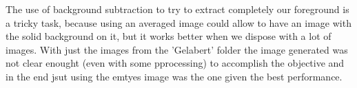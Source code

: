 \documentclass[10pt]{article}
\begin{document}
The use of background subtraction to try to extract completely our foreground is a tricky task, because using an averaged image could allow to have an image with the solid background on it, but it works better when we dispose with a lot of images. With just the images from the 'Gelabert' folder the image generated was not clear enought (even with some pprocessing) to accomplish the objective and in the end jsut using the emtyes image was the one given the best performance.\newline

\end{document}
